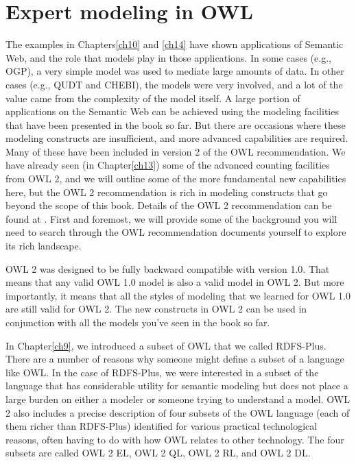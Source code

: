 \chapter{Expert modeling in OWL}
\label{ch16}

The examples in Chapters\ref{ch10} and \ref{ch14} have shown applications of Semantic
Web, and the role that models play in those applications. In some cases
(e.g., OGP), a very simple model was used to mediate large amounts of
data. In other cases (e.g., QUDT and CHEBI), the models were very
involved, and a lot of the value came from the complexity of the model
itself. A large portion of applications on the Semantic Web can be
achieved using the modeling facilities that have been presented in the
book so far. But there are occasions where these modeling constructs are
insufficient, and more advanced capabilities are required. Many of these
have been included in version 2 of the OWL recommendation. We have already
seen (in Chapter\ref{ch13}) some of the advanced counting facilities from OWL
2, and we will outline some of the more fundamental new capabilities
here, but the OWL 2 recommendation is rich in modeling constructs that go
beyond the scope of this book.  Details of the OWL 2 recommendation can be found at
\cite{Parsia:12:OWO}. First and foremost, we will provide some
of the background you will need to search through the OWL recommendation
documents yourself to explore its rich landscape.

OWL 2 was designed to be fully backward compatible with version 1.0.
That means that any valid OWL 1.0 model is also a valid model in OWL 2.
But more importantly, it means that all the styles of modeling that we
learned for OWL 1.0 are still valid for OWL 2. The new constructs in OWL
2 can be used in conjunction with all the models you've seen in the book
so far.

In Chapter\ref{ch9}, we introduced a subset of OWL that we called RDFS-Plus.
There are a number of reasons why someone might define a subset of a
language like OWL. In the case of RDFS-Plus, we were interested in a
subset of the language that has considerable utility for semantic
modeling but does not place a large burden on either a modeler or
someone trying to understand a model. OWL 2 also includes a precise
description of four subsets of the OWL language (each of them richer
than RDFS-Plus) identified for various practical technological reasons,
often having to do with how OWL relates to other technology. The four
subsets are called OWL 2 EL, OWL 2 QL, OWL 2 RL, and OWL 2 DL.



